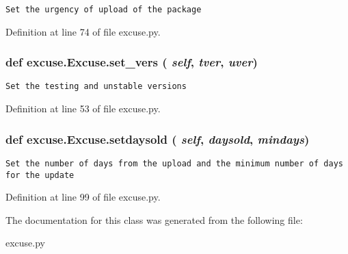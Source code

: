 \footnotesize\begin{verbatim}Set the urgency of upload of the package\end{verbatim}
\normalsize
 

Definition at line 74 of file excuse.py.
\subsubsection{\setlength{\rightskip}{0pt plus 5cm}def excuse.Excuse.set\_\-vers ( {\em self},  {\em tver},  {\em uver})}\label{classexcuse_1_1Excuse_b8751fc5d0033b4c734c476d92841d99}




\footnotesize\begin{verbatim}Set the testing and unstable versions\end{verbatim}
\normalsize
 

Definition at line 53 of file excuse.py.
\subsubsection{\setlength{\rightskip}{0pt plus 5cm}def excuse.Excuse.setdaysold ( {\em self},  {\em daysold},  {\em mindays})}\label{classexcuse_1_1Excuse_cf1fa7c6fb741bbe7e3120113748f3a5}




\footnotesize\begin{verbatim}Set the number of days from the upload and the minimum number of days for the update\end{verbatim}
\normalsize
 

Definition at line 99 of file excuse.py.

The documentation for this class was generated from the following file:\begin{CompactItemize}
\item 
excuse.py\end{CompactItemize}
